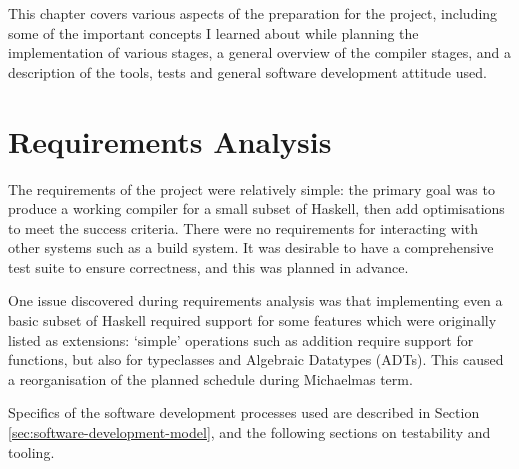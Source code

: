 \documentclass[dissertation.tex]{subfiles}
\begin{document}
This chapter covers various aspects of the preparation for the project, including some of the important concepts I learned about while planning the implementation of various stages, a general overview of the compiler stages, and a description of the tools, tests and general software development attitude used.

\section{Requirements Analysis}
{
    The requirements of the project were relatively simple: the primary goal was to produce a working compiler for a small subset of Haskell, then add optimisations to meet the success criteria. There were no requirements for interacting with other systems such as a build system. It was desirable to have a comprehensive test suite to ensure correctness, and this was planned in advance.

    One issue discovered during requirements analysis was that implementing even a basic subset of Haskell required support for some features which were originally listed as extensions: `simple' operations such as addition require support for functions, but also for typeclasses and Algebraic Datatypes (ADTs). This caused a reorganisation of the planned schedule during Michaelmas term.

    Specifics of the software development processes used are described in Section \ref{sec:software-development-model}, and the following sections on testability and tooling.
}
\end{document}
